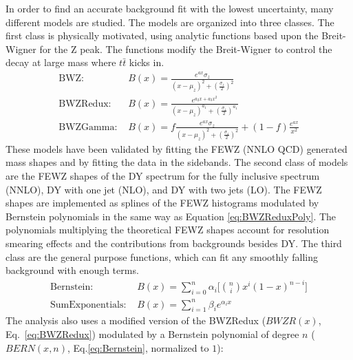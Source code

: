 In order to find an accurate background fit with the lowest uncertainty, many different models are studied. The models are organized into three classes. The first class is physically motivated, using analytic functions based upon the Breit-Wigner for the Z peak. The functions modify the Breit-Wigner to control the decay at large mass where $t\bar{t}$ kicks in. 
\begin{align}
        \label{eq:BWZ}
        \text{BWZ: }& {B(x)} = {\frac{e^{ax}\sigma_{z}}{(x-\mu_{z})^2 + (\frac{\sigma_{z}}{2})^2}} \\
        \label{eq:BWZRedux}
        \text{BWZRedux: }& {B(x)} = {\frac{e^{a_{2}x + a_{3}x^2}}{(x-\mu_{z})^{a_{1}} + (\frac{\sigma_{z}}{2})^{a_{1}}}} \\
        \label{eq:BWZGamma}
        \text{BWZGamma: }& {B(x)} = {f\frac{e^{ax}\sigma_{z}}{(x-\mu_{z})^2 + (\frac{\sigma_{z}}{2})^2} + (1-f)\frac{e^{ax}}{x^2}}
\end{align}
These models have been validated by fitting the FEWZ (NNLO QCD) generated mass shapes and by fitting the data in the sidebands. The second class of models are the FEWZ shapes of the DY spectrum for the fully inclusive spectrum (NNLO), DY with one jet (NLO), and DY with two jets (LO). The FEWZ shapes are implemented as splines of the FEWZ histograms modulated by Bernstein polynomials in the same way as Equation \ref{eq:BWZReduxPoly}. The polynomials multiplying the theoretical FEWZ shapes account for resolution smearing effects and the contributions from backgrounds besides DY. The third class are the general purpose functions, which can fit any smoothly falling background with enough terms.
\begin{align}
        \label{eq:Bernstein}
        \text{Bernstein: }& {B(x)} = {\sum_{i=0}^{n} \alpha_i[\binom{n}{i}x^{i}(1-x)^{n-i}}] \\
        \label{eq:SumExponentials}
        \text{SumExponentials: }& {B(x)} = {\sum_{i=1}^{n} \beta_{i}e^{\alpha_{i}x}}
\end{align}
The analysis also uses a modified version of the BWZRedux ($BWZR(x)$, Eq.~\ref{eq:BWZRedux}) modulated by a Bernstein polynomial of degree $n$ ($BERN(x,n)$, Eq.\ref{eq:Bernstein}, normalized to $1$):
